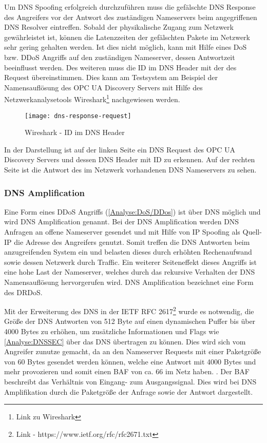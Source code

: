 Um \ac{DNS} Spoofing erfolgreich durchzuführen muss die gefälschte \ac{DNS} Response des Angreifers vor der Antwort des zuständigen Nameservers beim angegriffenen \ac{DNS} Resolver eintreffen. Sobald der physikalische Zugang zum Netzwerk gewährleistet ist, können die Latenzzeiten der gefälschten Pakete im Netzwerk sehr gering gehalten werden. Ist dies nicht möglich, kann mit Hilfe eines \ac{DoS} bzw. \ac{DDoS} Angriffs auf den zuständigen Nameserver, dessen Antwortzeit beeinflusst werden. Des weiteren muss die ID im \ac{DNS} Header mit der des Request übereinstimmen. Dies kann am Testsystem am Beispiel der Namensauflösung des \ac{OPC UA} Discovery Servers mit Hilfe des Netzwerkanalysetools Wireshark\footnote{Link zu Wireshark} nachgewiesen werden.

\begin{figure}[h]
    \centering
    \texttt{[image: dns-response-request]}
    \caption{Wireshark - ID im DNS Header}
    \label{Analyse:DNS Request Response}
  \end{figure}
  
\clearpage

In der Darstellung ist auf der linken Seite ein DNS Request des \ac{OPC UA} Discovery Servers und dessen DNS Header mit ID zu erkennen. Auf der rechten Seite ist die Antwort des im Netzwerk vorhandenen \ac{DNS} Nameservers zu sehen.

\subsubsection{\ac{DNS} Amplification}
Eine Form eines \ac{DDoS} Angriffs (\autoref{Analyse:DoS/DDos}) ist über \ac{DNS} möglich und wird \ac{DNS} Amplification genannt. Bei der \ac{DNS} Amplification werden \ac{DNS} Anfragen an offene Nameserver gesendet und mit Hilfe von \ac{IP} Spoofing als Quell-\ac{IP} die Adresse des Angreifers genutzt. Somit treffen die \ac{DNS} Antworten beim anzugreifenden System ein und belasten dieses durch erhöhten Rechenaufwand sowie dessen Netzwerk durch Traffic. Ein weiterer Seiteneffekt dieses Angriffs ist eine hohe Last der Nameserver, welches durch das rekursive Verhalten der \ac{DNS} Namensauflösung hervorgerufen wird. \ac{DNS} Amplification bezeichnet eine Form des \ac{DRDoS}.

Mit der Erweiterung des \ac{DNS} in der \ac{IETF} \ac{RFC} 2617\footnote{Link - https://www.ietf.org/rfc/rfc2671.txt} wurde es notwendig, die Größe der \ac{DNS} Antworten von 512 Byte auf einen dynamischen Puffer bis über 4000 Bytes zu erhöhen, um zusätzliche Informationen und Flags wie \autoref{Analyse:DNSSEC} über das \ac{DNS} übertragen zu können. Dies wird sich vom Angreifer zunutze gemacht, da an den Nameserver Requests mit einer Paketgröße von 60 Bytes gesendet werden können, welche eine Antwort mit 4000 Bytes und mehr provozieren und somit einen \ac{BAF} von ca. 66 im Netz haben. \cite{Ledermueller2009}. Der \ac{BAF} beschreibt das Verhältnis von Eingang- zum Ausgangssignal. Dies wird bei \ac{DNS} Amplifikation durch die Paketgröße der Anfrage sowie der Antwort dargestellt.

